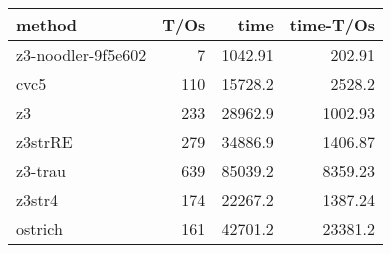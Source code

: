 \begin{tabular}{lrrr}
\hline
 method             &   T/Os &     time &   time-T/Os \\
\hline
 z3-noodler-9f5e602 &      7 &  1042.91 &      202.91 \\
 cvc5               &    110 & 15728.2  &     2528.2  \\
 z3                 &    233 & 28962.9  &     1002.93 \\
 z3strRE            &    279 & 34886.9  &     1406.87 \\
 z3-trau            &    639 & 85039.2  &     8359.23 \\
 z3str4             &    174 & 22267.2  &     1387.24 \\
 ostrich            &    161 & 42701.2  &    23381.2  \\
\hline
\end{tabular}
